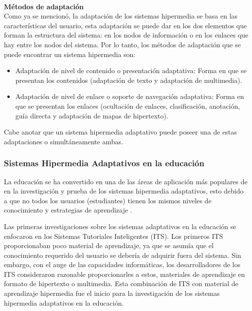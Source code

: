 \ \\
\textbf{Métodos de adaptación} \cite{Brusilovsky1996} \ \\
Como ya se mencionó, la adaptación de los sistemas hipermedia se basa en las características del usuario, esta adaptación se puede dar en los dos elementos que forman la estructura del sistema: en los nodos de información o en los enlaces que hay entre los nodos del sistema. Por lo tanto, los métodos de adaptación que se puede encontrar un sistema hipermedia son:

\begin{itemize}
    \item Adaptación de nivel de contenido o presentación adaptativa: Forma en que se presentan los contenidos (adaptación de texto y adaptación de multimedia).

\item Adaptación de nivel de enlace o soporte de navegación adaptativa: Forma en que se presentan los enlaces (ocultación de enlaces, clasificación, anotación, guía directa y adaptación de mapas de hipertexto).

\end{itemize}
Cabe anotar que un sistema hipermedia adaptativo puede poseer una de estas adaptaciones o simultáneamente ambas.


\subsubsection{Sistemas Hipermedia Adaptativos en la educación}
La educación se ha convertido en una de las áreas de aplicación más populares de en la investigación y prueba de los sistemas hipermedia adaptativos, esto debido a que no todos los usuarios (estudiantes) tienen los mismos niveles de conocimiento y estrategias de aprendizaje \cite{Brusilovsky1996} . 
	
Las primeras investigaciones sobre los sistemas adaptativos en la educación se enfocaron en los Sistemas Tutoriales Inteligentes (ITS). Los primeros ITS proporcionaban poco material de aprendizaje, ya que se asumía que el conocimiento requerido del usuario se debería de adquirir fuera del sistema. Sin embargo, con el auge de las capacidades informáticas, los desarrolladores de los ITS consideraron razonable proporcionarles a estos, materiales de aprendizaje en formato de hipertexto o multimedia. Esta combinación de ITS con material de aprendizaje hipermedia fue el inicio para la investigación de los sistemas hipermedia adaptativos en la educación. 

